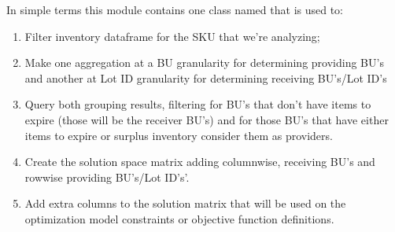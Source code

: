 \documentclass[letterpaper,10pt,english]{sphinxmanual}
\begin{document}
In simple terms this module contains one class named {\hyperref[\detokenize{source/optimization:optimization.solspace.SolutionSpace}]{}} that is used to:
\begin{enumerate}
%
\item {} 
Filter inventory dataframe for the SKU that we’re analyzing;

\item {} 
Make one aggregation at a BU granularity for determining providing BU’s and another at Lot ID granularity for determining receiving BU’s/Lot ID’s

\item {} 
Query both grouping results, filtering for BU’s that don’t have items to expire (those will be the receiver BU’s) and for those BU’s that have either items to expire or surplus inventory consider them as providers.

\item {} 
Create the solution space matrix adding column\sphinxhyphen{}wise, receiving BU’s and row\sphinxhyphen{}wise providing  BU’s/Lot ID’s’.

\item {} 
Add extra columns to the solution matrix that will be used on the optimization model constraints or objective function definitions.

\end{enumerate}
\end{document}
